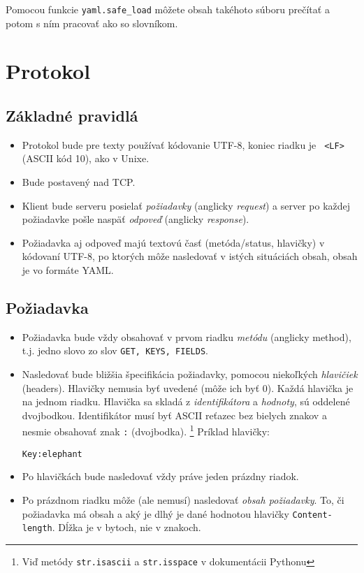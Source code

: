 \documentclass[11pt]{article}
\theoremstyle{definition}
\begin{document}
Pomocou funkcie \texttt{yaml.safe\_load} môžete obsah takéhoto súboru prečítať a potom s ním pracovať ako so slovníkom.
\begin{framed}

\end{framed}

\section{Protokol}

\subsection{Základné pravidlá}

\begin{itemize}
\item Protokol bude pre texty používať kódovanie UTF-8, koniec riadku je {\tt
<LF>} (ASCII kód 10), ako v Unixe.
\item Bude postavený nad TCP.
\item Klient bude serveru posielať \emph{požiadavky} (anglicky \emph{request}) a server po každej požiadavke pošle
naspäť \emph{odpoveď} (anglicky \emph{response}).
\item Požiadavka aj odpoveď majú textovú časť (metóda/status, hlavičky) v kódovaní UTF-8, po ktorých môže nasledovať v istých situáciách obsah, obsah je vo formáte YAML.
\end{itemize}
\subsection{Požiadavka}
\begin{itemize}
\item Požiadavka bude vždy obsahovať v prvom riadku \emph{metódu} (anglicky method), t.j. jedno slovo zo slov \texttt{GET, KEYS, FIELDS}.
\item Nasledovať bude bližšia špecifikácia požiadavky, pomocou niekoľkých \emph{hlavičiek}
(headers). Hlavičky nemusia byť uvedené (môže ich byť 0). Každá hlavička je na jednom
riadku. Hlavička sa skladá z \emph{identifikátora} a \emph{hodnoty}, sú oddelené dvojbodkou.
Identifikátor musí byť ASCII reťazec bez bielych znakov a nesmie obsahovať znak \texttt{:}
(dvojbodka).
\footnote{Viď metódy \texttt{str.isascii} a \texttt{str.isspace} v dokumentácii Pythonu}
Príklad hlavičky:
\begin{flushleft}
\texttt{Key:elephant}
\end{flushleft}
\item Po hlavičkách bude nasledovať vždy práve jeden prázdny riadok.
\item Po prázdnom riadku môže (ale nemusí) nasledovať \emph{obsah požiadavky}. To, či
požiadavka má obsah a aký je dlhý je dané hodnotou hlavičky \texttt{Content-length}. Dĺžka je v bytoch, nie v znakoch.
\end{itemize}
\end{document}

